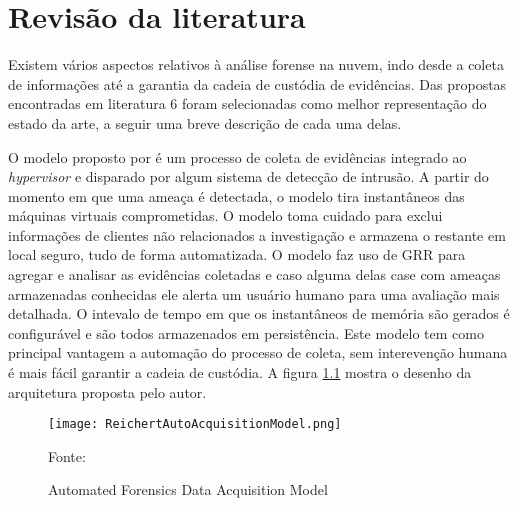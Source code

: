 \chapter{Revisão da literatura}
\label{chp:revisão}


Existem vários aspectos relativos à análise forense na nuvem, indo desde a coleta de informações até a garantia da cadeia de custódia de evidências.
%
Das propostas encontradas em literatura 6 foram selecionadas como melhor representação do estado da arte, a seguir uma breve descrição de cada uma delas.

%
O modelo proposto por \cite{ReichertAutoAcquisition:2015} é um processo de coleta de evidências integrado ao \textit{hypervisor} e disparado por algum sistema de detecção de intrusão. 
%
A partir do momento em que uma ameaça é detectada, o modelo tira instantâneos das máquinas virtuais comprometidas. O modelo toma cuidado para exclui informações de clientes não relacionados a investigação e armazena o restante em local seguro, tudo de forma automatizada. 
%
O modelo faz uso de GRR para agregar e analisar as evidências coletadas e caso alguma delas case com ameaças armazenadas conhecidas ele alerta um usuário humano para uma avaliação mais detalhada.
%
O intevalo de tempo em que os instantâneos de memória são gerados é configurável e são todos armazenados em persistência.
%
Este modelo tem como principal vantagem a automação do processo de coleta, sem interevenção humana é mais fácil garantir a cadeia de custódia. 
%
A figura \ref{fig:ReichertAutoAcquisitionModel} mostra o desenho da arquitetura proposta pelo autor.

\begin{figure}[htb!]
\footnotesize
\caption{Automated Forensics Data Acquisition Model}
\texttt{[image: ReichertAutoAcquisitionModel.png]}
\centering
\label{fig:ReichertAutoAcquisitionModel}
\begin{center}
Fonte: \cite{ReichertAutoAcquisition:2015} 
\end{center}
\end{figure}

